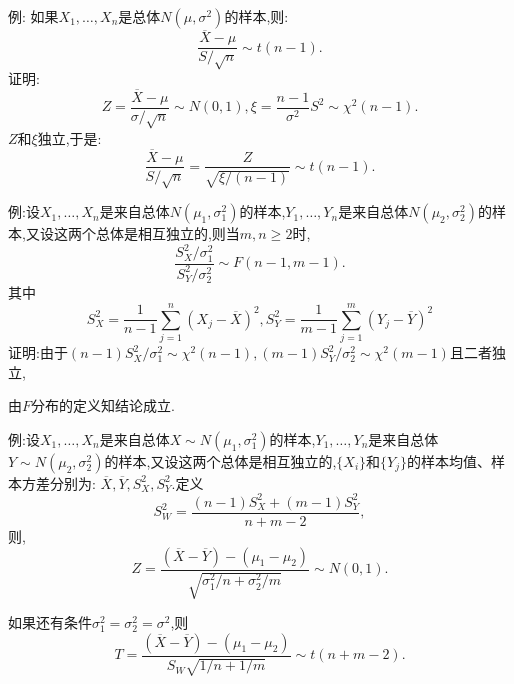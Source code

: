 	\begin{frame}
		例: 如果$X_1,\dots,X_n$是总体$N(\mu,\sigma^2)$的样本,则:
		\alert{
			\begin{equation}
				\frac{\overline{X}-\mu}{S/\sqrt{n}}\sim t(n-1).
			\end{equation}
		}
		证明:
		\begin{equation}
			Z = \frac{\overline{X}-\mu}{\sigma/\sqrt{n}}\sim N(0,1),\xi = \frac{n-1}{\sigma^2}S^2\sim\chi^2(n-1).
		\end{equation}
		$Z$和$\xi$独立,于是:
		\begin{equation}
			\frac{\overline{X}-\mu}{S/\sqrt{n}} = \frac{Z}{\sqrt{\xi/(n-1)}}\sim t(n-1).
		\end{equation}
	\end{frame}

	\begin{frame}
		例:设$X_1,\dots,X_n$是来自总体$N(\mu_1,\sigma_1^2)$的样本,$Y_1,\dots,Y_n$是来自总体$N(\mu_2,\sigma_2^2)$的样本,又设这两个总体是相互独立的,则当$m,n\geqslant 2$时,
		\alert{
			\begin{equation}
				\frac{S_X^2/\sigma_1^2}{S_Y^2/\sigma_2^2}\sim F(n-1,m-1).
			\end{equation}
		}
		其中
		\begin{equation}
			S_X^2 = \frac{1}{n-1}\sum_{j=1}^{n}(X_j-\overline{X})^2,S_Y^2 = \frac{1}{m-1}\sum_{j=1}^{m}(Y_j-\overline{Y})^2
		\end{equation}
		证明:由于$(n-1)S_X^2/\sigma_1^2\sim\chi^2(n-1),(m-1)S_Y^2/\sigma_2^2\sim\chi^2(m-1)$且二者独立,
		
		由$F$分布的定义知结论成立.
	\end{frame}

	\begin{frame}
		例:设$X_1,\dots,X_n$是来自总体$X\sim N(\mu_1,\sigma_1^2)$的样本,$Y_1,\dots,Y_n$是来自总体$Y\sim N(\mu_2,\sigma_2^2)$的样本,又设这两个总体是相互独立的,$\{X_i\}$和$\{Y_j\}$的样本均值、样本方差分别为:
		$\overline{X},\overline{Y},S_X^2,S_Y^2$.定义
		\begin{equation}
			S_W^2 = \frac{(n-1)S_X^2+(m-1)S_Y^2}{n+m-2},
		\end{equation}
		则,
		\alert{
			\begin{equation}
				Z=\frac{(\overline{X}-\overline{Y})-(\mu_1-\mu_2)}{\sqrt{\sigma_1^2/n+\sigma_2^2/m}}\sim N(0,1).
			\end{equation}
		}
	
		如果还有条件$\sigma_1^2 = \sigma_2^2 = \sigma^2$,则
		\alert{
			\begin{equation}
				T=\frac{(\overline{X}-\overline{Y})-(\mu_1-\mu_2)}{S_W\sqrt{1/n+1/m}}\sim t(n+m-2).
			\end{equation}
		}
	\end{frame}

